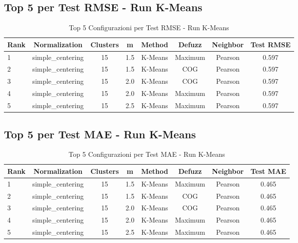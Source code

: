 \subsection{Top 5 per Test RMSE - Run K-Means}
\begin{table}[h]
    \centering
    \caption{Top 5 Configurazioni per Test RMSE - Run K-Means}
    \begin{tabular}{|l|c|c|c|c|c|c|c|}
    \hline
    \textbf{Rank} & \textbf{Normalization} & \textbf{Clusters} & \textbf{m} & \textbf{Method} & \textbf{Defuzz} & \textbf{Neighbor} & \textbf{Test RMSE} \\
    \hline
    1 & simple\_centering & 15 & 1.5 & K-Means & Maximum & Pearson & 0.597 \\
    2 & simple\_centering & 15 & 1.5 & K-Means & COG & Pearson & 0.597 \\
    3 & simple\_centering & 15 & 2.0 & K-Means & COG & Pearson & 0.597 \\
    4 & simple\_centering & 15 & 2.0 & K-Means & Maximum & Pearson & 0.597 \\
    5 & simple\_centering & 15 & 2.5 & K-Means & Maximum & Pearson & 0.597 \\
    \hline
    \end{tabular}
    \end{table}

\subsection{Top 5 per Test MAE - Run K-Means}
\begin{table}[h]
    \centering
    \caption{Top 5 Configurazioni per Test MAE - Run K-Means}
    \begin{tabular}{|l|c|c|c|c|c|c|c|}
    \hline
    \textbf{Rank} & \textbf{Normalization} & \textbf{Clusters} & \textbf{m} & \textbf{Method} & \textbf{Defuzz} & \textbf{Neighbor} & \textbf{Test MAE} \\
    \hline
    1 & simple\_centering & 15 & 1.5 & K-Means & Maximum & Pearson & 0.465 \\
    2 & simple\_centering & 15 & 1.5 & K-Means & COG & Pearson & 0.465 \\
    3 & simple\_centering & 15 & 2.0 & K-Means & COG & Pearson & 0.465 \\
    4 & simple\_centering & 15 & 2.0 & K-Means & Maximum & Pearson & 0.465 \\
    5 & simple\_centering & 15 & 2.5 & K-Means & Maximum & Pearson & 0.465 \\
    \hline
    \end{tabular}
    \end{table}
